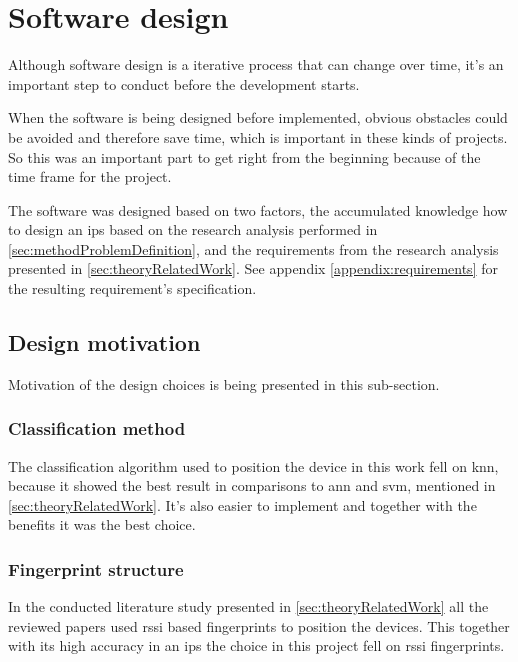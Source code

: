 \section{Software design}\label{sec:methodSoftwareDesign}
Although software design is a iterative process that can change over time, it's an important step to conduct before the development starts. \cite{EngineeringDesignIts1989, ImportanceBusinessProcess2008}

\bigskip

When the software is being designed before implemented, obvious obstacles could be avoided and therefore save time, which is important in these kinds of projects.
So this was an important part to get right from the beginning because of the time frame for the project.

\bigskip

The software was designed based on two factors, the accumulated knowledge how to design an \acrshort{ips} based on the research analysis performed in \cref{sec:methodProblemDefinition}, and the requirements from the research analysis presented in \cref{sec:theoryRelatedWork}.
See appendix \ref{appendix:requirements} for the resulting requirement's specification.


\subsection{Design motivation}\label{sec:methodDesignMotivation}
Motivation of the design choices is being presented in this sub-section.


\subsubsection{Classification method}\label{sec:methodSoftwareDesignClassification}
The classification algorithm used to position the device in this work fell on \acrfull{knn}, because it showed the best result in comparisons to \acrlong{ann} and \acrlong{svm}, mentioned in \cref{sec:theoryRelatedWork}.
It's also easier to implement and together with the benefits it was the best choice.


\subsubsection{Fingerprint structure}\label{sec:methodSoftwareDesignFingerprint}
In the conducted literature study presented in \cref{sec:theoryRelatedWork} all the reviewed papers used \acrfull{rssi} based fingerprints to position the devices.
This together with its high accuracy in an \acrshort{ips} the choice in this project fell on \acrshort{rssi} fingerprints.


